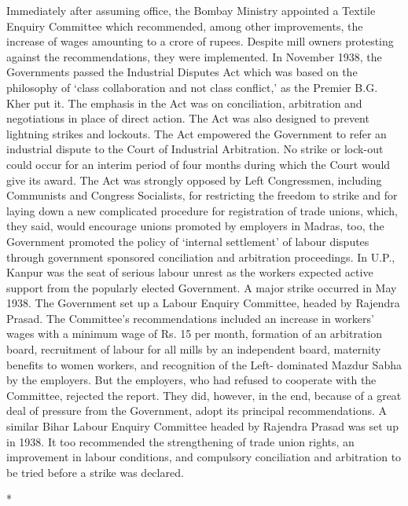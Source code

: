 Immediately after assuming office, the Bombay Ministry appointed a Textile Enquiry Committee which recommended, among other improvements, the increase of wages amounting to a crore of rupees. Despite mill owners protesting against the recommendations, they were implemented. In November 1938, the Governments passed the Industrial Disputes Act which was based on the philosophy of `class collaboration and not class conflict,' as the Premier B.G. Kher put it. The emphasis in the Act was on conciliation, arbitration and negotiations in place of direct action. The Act was also designed to prevent lightning strikes and lockouts. The Act empowered the Government to refer an industrial dispute to the Court of Industrial Arbitration. No strike or lock-out could occur for an interim period of four months during which the Court would give its award. The Act was strongly opposed by Left Congressmen, including Communists and Congress Socialists, for restricting the freedom to strike and for laying down a new complicated procedure for registration of trade unions, which, they said, would encourage unions promoted by employers in Madras, too, the Government promoted the policy of `internal settlement' of labour disputes through government sponsored conciliation and arbitration proceedings. In U.P., Kanpur was the seat of serious labour unrest as the workers expected active support from the popularly elected Government. A major strike occurred in May 1938. The Government set up a Labour Enquiry Committee, headed by Rajendra Prasad. The Committee's recommendations included an increase in workers' wages with a minimum wage of Rs. 15 per month, formation of an arbitration board, recruitment of labour for all mills by an independent board, maternity benefits to women workers, and recognition of the Left- dominated Mazdur Sabha by the employers. But the employers, who had refused to cooperate with the Committee, rejected the report. They did, however, in the end, because of a great deal of pressure from the Government, adopt its principal recommendations. A similar Bihar Labour Enquiry Committee headed by Rajendra Prasad was set up in 1938. It too recommended the strengthening of trade union rights, an improvement in labour conditions, and compulsory conciliation and arbitration to be tried before a strike was declared.

\begin{center}*\end{center}

\paragraph*{}

